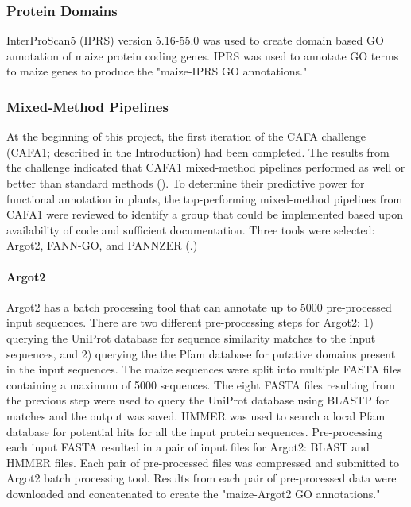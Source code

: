 \subsubsection {Protein Domains} \label{meth:prot_dom}
InterProScan5 (IPRS) version 5.16-55.0 was used to create domain based GO annotation of maize protein coding genes. IPRS was used to annotate GO terms to maize genes to produce the "maize-IPRS GO annotations."

\subsubsection{Mixed-Method Pipelines} \label{meth:mix_meth}
At the beginning of this project, the first iteration of the CAFA challenge (CAFA1; described in the Introduction) had been completed. The results from the challenge indicated that CAFA1 mixed-method pipelines performed as well or better than standard methods (\cite{radivojac_2013-YN}). To determine their predictive power for functional annotation in plants, the top-performing mixed-method pipelines from CAFA1 were reviewed to identify a group that could be implemented based upon availability of code and sufficient documentation. Three tools were selected: Argot2, FANN-GO, and PANNZER (\cite{falda_2012-VX,clark_2011--Z,koskinen_2015-sl}.)

\paragraph{Argot2\\}
Argot2 has a batch processing tool that can annotate up to \num{5000} pre-processed input sequences. There are two different pre-processing steps for Argot2: 1) querying the UniProt database for sequence similarity matches to the input sequences, and 2) querying the the Pfam database for putative domains present in the input sequences. The maize sequences were split into multiple FASTA files containing a maximum of \num{5000} sequences. The eight FASTA files resulting from the previous step were used to query the UniProt database using BLASTP for matches and the output was saved. HMMER was used to search a local Pfam database for potential hits for all the input protein sequences. Pre-processing each input FASTA resulted in a pair of input files for Argot2: BLAST and HMMER files. Each pair of  pre-processed files was compressed and submitted to Argot2 batch processing tool. Results from each pair of pre-processed data were downloaded and concatenated to create the "maize-Argot2 GO annotations."

